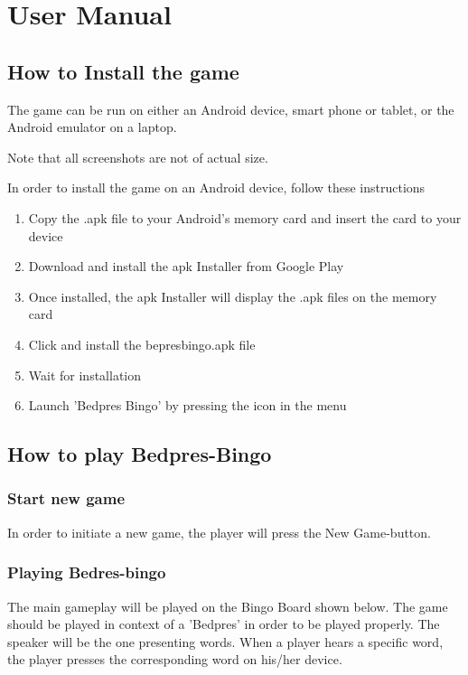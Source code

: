 \section{User Manual}
\label{usermanual}

\subsection{How to Install the game}
The game can be run on either an Android device, smart phone or tablet, or the Android emulator on a laptop. 

Note that all screenshots are not of actual size.

In order to install the game on an Android device, follow these instructions
\begin{enumerate}
\item{Copy the .apk file to your Android's memory card and insert the card to your device}
\item{Download and install the apk Installer from Google Play \cite{https://play.google.com/store/search?q=apps+installer&c=apps&safe=3}}
\item{Once installed, the apk Installer will display the .apk files on the memory card}
\item{Click and install the bepresbingo.apk file}
\item{Wait for installation}
\item{Launch 'Bedpres Bingo' by pressing the icon in the menu}
\end{enumerate}


\subsection{How to play Bedpres-Bingo}

\subsubsection{Start new game}
In order to initiate a new game, the player will press the New Game-button. 
\begin{center}
\end{center}

\subsubsection{Playing Bedres-bingo}
The main gameplay will be played on the Bingo Board shown below. The game should be played in context of a 'Bedpres' in order to be played properly. The speaker will be the one presenting words. When a player hears a specific word, the player presses the corresponding word on his/her device. 

